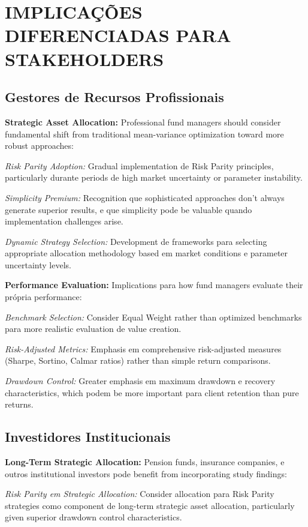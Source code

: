 \section{IMPLICAÇÕES DIFERENCIADAS PARA STAKEHOLDERS}

\subsection{Gestores de Recursos Profissionais}

\textbf{Strategic Asset Allocation:} Professional fund managers should consider fundamental shift from traditional mean-variance optimization toward more robust approaches:

\textit{Risk Parity Adoption:} Gradual implementation de Risk Parity principles, particularly durante periods de high market uncertainty or parameter instability.

\textit{Simplicity Premium:} Recognition que sophisticated approaches don't always generate superior results, e que simplicity pode be valuable quando implementation challenges arise.

\textit{Dynamic Strategy Selection:} Development de frameworks para selecting appropriate allocation methodology based em market conditions e parameter uncertainty levels.

\textbf{Performance Evaluation:} Implications para how fund managers evaluate their própria performance:

\textit{Benchmark Selection:} Consider Equal Weight rather than optimized benchmarks para more realistic evaluation de value creation.

\textit{Risk-Adjusted Metrics:} Emphasis em comprehensive risk-adjusted measures (Sharpe, Sortino, Calmar ratios) rather than simple return comparisons.

\textit{Drawdown Control:} Greater emphasis em maximum drawdown e recovery characteristics, which podem be more important para client retention than pure returns.

\subsection{Investidores Institucionais}

\textbf{Long-Term Strategic Allocation:} Pension funds, insurance companies, e outros institutional investors pode benefit from incorporating study findings:

\textit{Risk Parity em Strategic Allocation:} Consider allocation para Risk Parity strategies como component de long-term strategic asset allocation, particularly given superior drawdown control characteristics.

